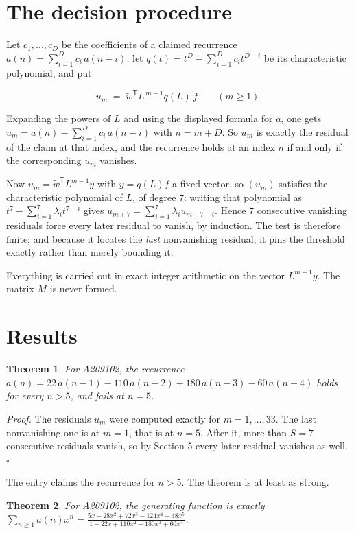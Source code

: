\documentclass[11pt]{article}
\newtheorem{theorem}{Theorem}
\theoremstyle{definition}
\begin{document}
\section{The decision procedure}

Let $c_1,\dots,c_D$ be the coefficients of a claimed recurrence $a(n) = \sum_{i=1}^{D} c_i\,a(n-i)$, let $q(t) = t^{D} - \sum_{i=1}^{D} c_i t^{D-i}$ be its characteristic polynomial, and put

\[u_m \;=\; \tilde w^{\mathsf T} L^{\,m-1} q(L)\,\tilde f \qquad (m \ge 1).\]

Expanding the powers of $L$ and using the displayed formula for $a$, one gets $u_m = a(n) - \sum_{i=1}^{D} c_i\,a(n-i)$ with $n = m + D$. So $u_m$ is exactly the residual of the claim at that index, and the recurrence holds at an index $n$ if and only if the corresponding $u_m$ vanishes.

Now $u_m = \tilde w^{\mathsf T} L^{m-1} y$ with $y = q(L)\tilde f$ a fixed vector, so $(u_m)$ satisfies the characteristic polynomial of $L$, of degree $7$: writing that polynomial as $t^{7} - \sum_{i=1}^{7} \lambda_i t^{7-i}$ gives $u_{m+7} = \sum_{i=1}^{7} \lambda_i u_{m+7-i}$. Hence $7$ consecutive vanishing residuals force every later residual to vanish, by induction. The test is therefore finite; and because it locates the {\itshape last} nonvanishing residual, it pins the threshold exactly rather than merely bounding it.

Everything is carried out in exact integer arithmetic on the vector $L^{m-1}y$. The matrix $M$ is never formed.

\section{Results}

\begin{theorem} For A209102, the recurrence $a(n) = 22\,a(n-1) - 110\,a(n-2) + 180\,a(n-3) - 60\,a(n-4)$ holds for every $n > 5$, and fails at $n = 5$.\end{theorem}

{\itshape Proof.} The residuals $u_m$ were computed exactly for $m = 1,\dots,33$. The last nonvanishing one is at $m = 1$, that is at $n = 5$. After it, more than $S = 7$ consecutive residuals vanish, so by Section 5 every later residual vanishes as well. $\square$

The entry claims the recurrence for $n > 5$. The theorem is at least as strong.

\begin{theorem} For A209102, the generating function is exactly $\sum_{n\ge 1} a(n)x^n = \frac{5x - 28x^{2} + 72x^{3} - 124x^{4} + 48x^{5}}{1 - 22x + 110x^{2} - 180x^{3} + 60x^{4}}$.\end{theorem}
\end{document}
